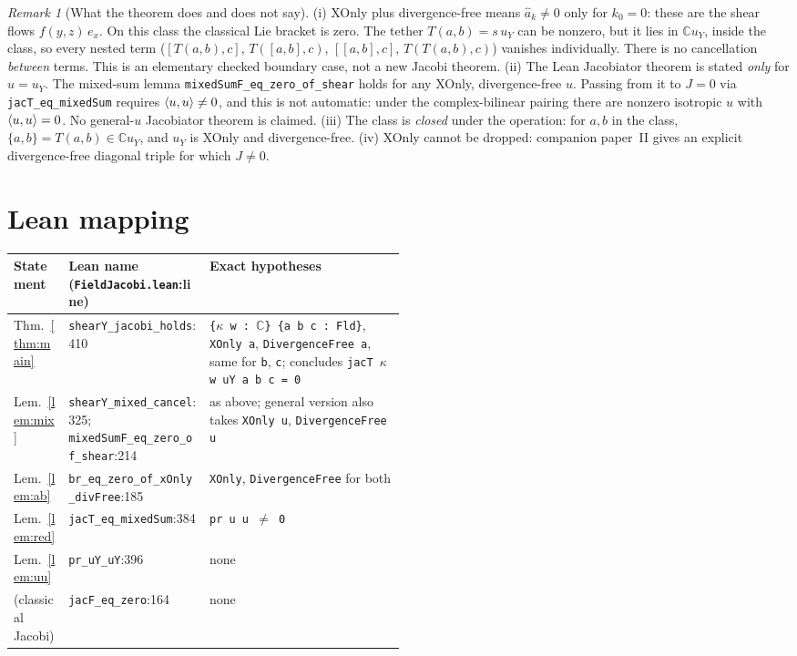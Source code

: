 \documentclass[11pt]{article}\emergencystretch=2em
\theoremstyle{definition}\newtheorem{definition}[theorem]{Definition}\theoremstyle{remark}\newtheorem{remark}[theorem]{Remark}
\begin{document}
\begin{remark}[What the theorem does and does not say]
(i) XOnly plus divergence-free means $\hat a_k\ne0$ only for $k_0=0$: these are the shear flows $f(y,z)\,e_x$. On this class the classical Lie bracket is zero. The tether $T(a,b)=s\,u_Y$ can be nonzero, but it lies in $\mathbb C u_Y$, inside the class, so every nested term ($[T(a,b),c]$, $T([a,b],c)$, $[[a,b],c]$, $T(T(a,b),c)$) vanishes individually. There is no cancellation \emph{between} terms. This is an elementary checked boundary case, not a new Jacobi theorem.
(ii) The Lean Jacobiator theorem is stated \emph{only} for $u=u_Y$. The mixed-sum lemma \texttt{mixedSumF\_eq\_zero\_of\_shear} holds for any XOnly, divergence-free $u$. Passing from it to $J=0$ via \texttt{jacT\_eq\_mixedSum} requires $\langle u,u\rangle\ne0$, and this is not automatic: under the complex-bilinear pairing there are nonzero isotropic $u$ with $\langle u,u\rangle=0$. No general-$u$ Jacobiator theorem is claimed.
(iii) The class is \emph{closed} under the operation: for $a,b$ in the class, $\{a,b\}=T(a,b)\in\mathbb C u_Y$, and $u_Y$ is XOnly and divergence-free.
(iv) XOnly cannot be dropped: companion paper~II gives an explicit divergence-free diagonal triple for which $J\ne0$.
\end{remark}
\section{Lean mapping}
\small\begin{tabularx}{\linewidth}{@{}>{\raggedright}p{0.14\linewidth}>{\raggedright}p{0.36\linewidth}>{\raggedright\arraybackslash}X@{}}\toprule
Statement & Lean name (\texttt{FieldJacobi.lean}:line) & Exact hypotheses\\\midrule
Thm.~\ref{thm:main} & \texttt{shearY\_jacobi\_holds}:410 & \texttt{\{$\kappa$ w : $\mathbb{C}$\} \{a b c : Fld\}}, \texttt{XOnly a}, \texttt{DivergenceFree a}, same for \texttt{b}, \texttt{c}; concludes \texttt{jacT $\kappa$ w uY a b c = 0}\\
Lem.~\ref{lem:mix} & \texttt{shearY\_mixed\_cancel}:325; \texttt{mixedSumF\_eq\_zero\_of\_shear}:214 & as above; general version also takes \texttt{XOnly u}, \texttt{DivergenceFree u}\\
Lem.~\ref{lem:ab} & \texttt{br\_eq\_zero\_of\_xOnly\_divFree}:185 & \texttt{XOnly}, \texttt{DivergenceFree} for both\\
Lem.~\ref{lem:red} & \texttt{jacT\_eq\_mixedSum}:384 & \texttt{pr u u $\ne$ 0}\\
Lem.~\ref{lem:uu} & \texttt{pr\_uY\_uY}:396 & none\\
(classical Jacobi) & \texttt{jacF\_eq\_zero}:164 & none\\
\bottomrule\end{tabularx}\normalsize
\end{document}
